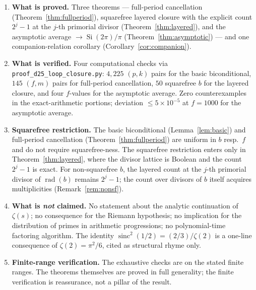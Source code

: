 \documentclass[11pt,reqno]{amsart}
\theoremstyle{plain}
\theoremstyle{definition}
\theoremstyle{remark}
\DeclareMathOperator{\sinc}{sinc}
\DeclareMathOperator{\rad}{rad}
\DeclareMathOperator{\Si}{Si}
\begin{document}
\begin{enumerate}[label={\upshape(\arabic*)}]
\item \textbf{What is proved.} Three theorems --- full-period
cancellation (Theorem~\ref{thm:fullperiod}), squarefree layered
closure with the explicit count $2^{j} - 1$ at the $j$-th primorial
divisor (Theorem~\ref{thm:layered}), and the asymptotic average
$\to \Si(2\pi)/\pi$ (Theorem~\ref{thm:asymptotic}) --- and one
companion-relation corollary (Corollary~\ref{cor:companion}).

\item \textbf{What is verified.} Four computational checks via
\texttt{proof\_d25\_loop\_closure.py}: $4{,}225$ $(p, k)$ pairs for
the basic biconditional, $145$ $(f, m)$ pairs for full-period
cancellation, $50$ squarefree $b$ for the layered closure, and four
$f$-values for the asymptotic average. Zero counterexamples in the
exact-arithmetic portions; deviation $\le 5 \times 10^{-5}$ at
$f = 1000$ for the asymptotic average.

\item \textbf{Squarefree restriction.} The basic biconditional
(Lemma~\ref{lem:basic}) and full-period cancellation
(Theorem~\ref{thm:fullperiod}) are uniform in $b$ resp.\ $f$ and do
not require squarefree-ness. The squarefree restriction enters only in
Theorem~\ref{thm:layered}, where the divisor lattice is Boolean and the
count $2^{j} - 1$ is exact. For non-squarefree $b$, the layered count
at the $j$-th primorial divisor of $\rad(b)$ remains $2^{j} - 1$;
the count over divisors of $b$ itself acquires multiplicities
(Remark~\ref{rem:nonsf}).

\item \textbf{What is \emph{not} claimed.} No statement about the
analytic continuation of $\zeta(s)$; no consequence for the Riemann
hypothesis; no implication for the distribution of primes in
arithmetic progressions; no polynomial-time factoring algorithm. The
identity $\sinc^{2}(1/2) = (2/3)/\zeta(2)$ is a one-line consequence
of $\zeta(2) = \pi^{2}/6$, cited as structural rhyme only.

\item \textbf{Finite-range verification.} The exhaustive checks are
on the stated finite ranges. The theorems themselves are proved in
full generality; the finite verification is reassurance, not a
pillar of the result.
\end{enumerate}
\end{document}
